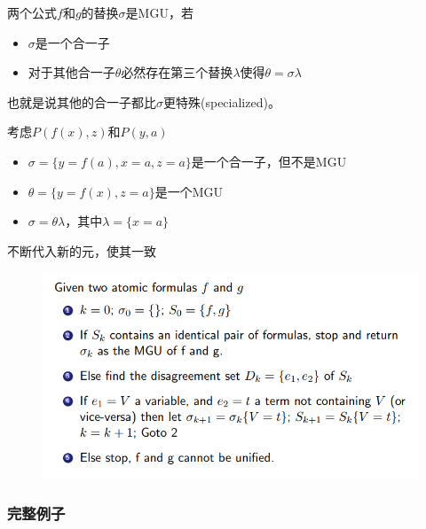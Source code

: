\begin{definition}
两个公式$f$和$g$的替换$\sigma$是MGU，若
\begin{itemize}
	\item $\sigma$是一个合一子
	\item 对于其他合一子$\theta$必然存在第三个替换$\lambda$使得$\theta=\sigma\lambda$
\end{itemize}
也就是说其他的合一子都比$\sigma$更特殊(specialized)。
\end{definition}
\begin{example}
考虑$P(f(x),z)$和$P(y,a)$
\begin{itemize}
	\item $\sigma=\{y=f(a),x=a,z=a\}$是一个合一子，但不是MGU
	\item $\theta=\{y=f(x),z=a\}$是一个MGU
	\item $\sigma=\theta\lambda$，其中$\lambda=\{x=a\}$
\end{itemize}
\end{example}

\begin{myalgorithm}[MGU]
不断代入新的元，使其一致
\begin{figure}[H]
\centering
\includegraphics[width=0.8\linewidth]{fig/MGU.png}
\end{figure}
\end{myalgorithm}

\subsubsection{完整例子}

